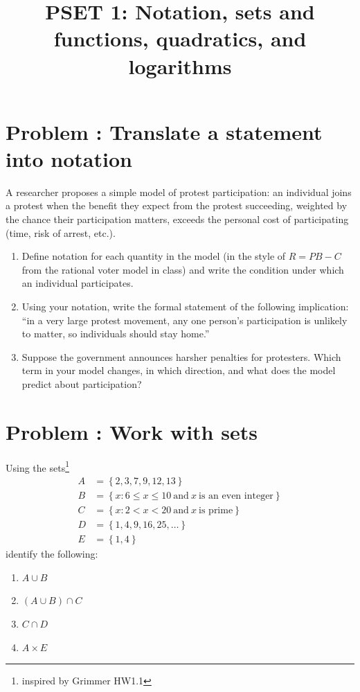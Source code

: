 \documentclass[11pt]{article}
\title{PSET 1: Notation, sets and functions, quadratics, and logarithms}
\author{}
\date{\vspace{-2.5em}}
\newcounter{problem}
\newcommand{\problem}[1]{\stepcounter{problem}\section*{Problem \theproblem: #1}}
\begin{document}
\maketitle



\problem{Translate a statement into notation}

A researcher proposes a simple model of protest participation: an
individual joins a protest when the benefit they expect from the
protest succeeding, weighted by the chance their participation
matters, exceeds the personal cost of participating (time, risk of
arrest, etc.).

\begin{enumerate}[label=\alph*.]
\item Define notation for each quantity in the model (in the style of
  \(R = PB - C\) from the rational voter model in class) and write the
  condition under which an individual participates.
\item Using your notation, write the formal statement of the following
  implication: ``in a very large protest movement, any one person's
  participation is unlikely to matter, so individuals should stay
  home.''
\item Suppose the government announces harsher penalties for
  protesters. Which term in your model changes, in which direction,
  and what does the model predict about participation?
\end{enumerate}

\problem{Work with sets}

Using the sets\footnote{inspired by Grimmer HW1.1}
\[
\begin{aligned}
A &= \left\{ 2, 3, 7, 9, 12, 13 \right\} \\
B &= \left\{ x : 6 \leq x \leq 10 \ \mbox{and} \ x \ \mbox{is an even integer} \right\} \\
C &= \left\{ x : 2 < x < 20 \ \mbox{and} \ x \ \mbox{is prime} \right\} \\
D &= \left\{ 1, 4, 9, 16, 25, \ldots \right\} \\
E &= \left\{ 1, 4 \right\}
\end{aligned}
\]
identify the following:

\begin{enumerate}[label=\alph*.]
\item \(A \cup B\)
\item \((A \cup B) \cap C\)
\item \(C \cap D\)
\item \(A \times E\)
\end{enumerate}
\end{document}
